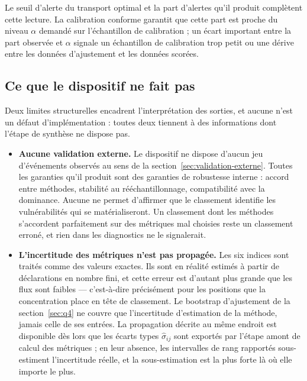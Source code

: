 \documentclass[11pt,a4paper]{article}
\theoremstyle{definition}
\theoremstyle{remark}
\begin{document}
\bigskip

Le seuil d'alerte du transport optimal et la part d'alertes qu'il produit complètent cette
lecture. La calibration conforme garantit que cette part est proche du niveau $\alpha$
demandé sur l'échantillon de calibration ; un écart important entre la part observée et
$\alpha$ signale un échantillon de calibration trop petit ou une dérive entre les données
d'ajustement et les données scorées.

\bigskip

\subsection{Ce que le dispositif ne fait pas}
\label{sec:app-limites}

\medskip

Deux limites structurelles encadrent l'interprétation des sorties, et aucune n'est un défaut
d'implémentation : toutes deux tiennent à des informations dont l'étape de synthèse ne
dispose pas.

\medskip

\begin{itemize}[leftmargin=1.4em,itemsep=3pt]
  \item \textbf{Aucune validation externe.} Le dispositif ne dispose d'aucun jeu
  d'événements observés au sens de la section~\ref{sec:validation-externe}. Toutes les
  garanties qu'il produit sont des garanties de robustesse interne : accord entre méthodes,
  stabilité au rééchantillonnage, compatibilité avec la dominance. Aucune ne permet
  d'affirmer que le classement identifie les vulnérabilités qui se matérialiseront. Un
  classement dont les méthodes s'accordent parfaitement sur des métriques mal choisies reste
  un classement erroné, et rien dans les diagnostics ne le signalerait.
  \item \textbf{L'incertitude des métriques n'est pas propagée.} Les six indices sont
  traités comme des valeurs exactes. Ils sont en réalité estimés à partir de déclarations
  en nombre fini, et cette erreur est d'autant plus grande que les flux sont faibles ---
  c'est-à-dire précisément pour les positions que la concentration place en tête de
  classement. Le bootstrap d'ajustement de la section~\ref{sec:q4} ne couvre que
  l'incertitude d'estimation de la méthode, jamais celle de ses entrées. La propagation
  décrite au même endroit est disponible dès lors que les écarts types
  $\hat{\sigma}_{ij}$ sont exportés par l'étape amont de calcul des métriques ; en leur
  absence, les intervalles de rang rapportés sous-estiment l'incertitude réelle, et la
  sous-estimation est la plus forte là où elle importe le plus.
\end{itemize}
\end{document}
